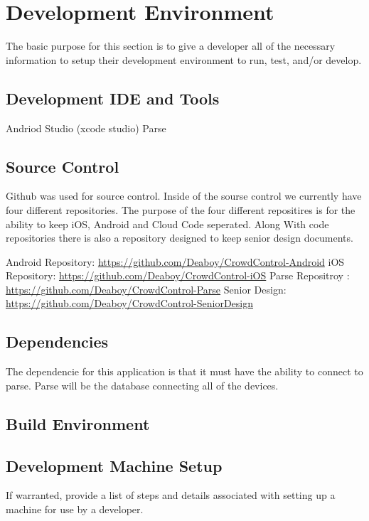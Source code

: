 \chapter{Development Environment}
The basic purpose for this section is to give a developer all of the necessary 
information to setup their development environment to run, test, and/or develop. 


\section{Development IDE and Tools}
Andriod Studio \newline
(xcode studio) \newline
Parse \newline

\section{Source  Control}
Github was used for source control. Inside of the sourse control we currently have four different repositories. The purpose of the four different repositires is for the ability to keep iOS, Android and Cloud Code seperated. Along With code repositories there is also a repository designed to keep senior design documents.
\newline


\noindent Android Repository:  \url{https://github.com/Deaboy/CrowdControl-Android} \newline
iOS Repository: \url{https://github.com/Deaboy/CrowdControl-iOS} \newline
Parse Repositroy : \url{https://github.com/Deaboy/CrowdControl-Parse} \newline
Senior Design: \url{https://github.com/Deaboy/CrowdControl-SeniorDesign}

\section{Dependencies}
The dependencie for this application is that it must have the ability to connect to parse. Parse will be the database connecting all of the devices.

\section{Build  Environment}


\section{Development Machine Setup}
If warranted, provide a list of steps and details associated with setting up a 
machine for use by a developer. 

